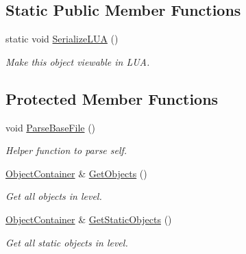 \subsection*{Static Public Member Functions}
\begin{DoxyCompactItemize}
\item 
static void \hyperlink{classLevel_ab98f9b8b299ed04baf8416a2c2664e66}{Serialize\+L\+UA} ()
\begin{DoxyCompactList}\small\item\em Make this object viewable in L\+UA. \end{DoxyCompactList}\end{DoxyCompactItemize}
\subsection*{Protected Member Functions}
\begin{DoxyCompactItemize}
\item 
void \hyperlink{classLevel_abd967e5cb5aaf80e35d3b5b2a1038468}{Parse\+Base\+File} ()
\begin{DoxyCompactList}\small\item\em Helper function to parse self. \end{DoxyCompactList}\item 
\hyperlink{classLevel_afd39ad8a5d9272ab8e14853e0fb18a48}{Object\+Container} \& \hyperlink{classLevel_afffae2c1f9f3cf545ec226f5d012910e}{Get\+Objects} ()
\begin{DoxyCompactList}\small\item\em Get all objects in level. \end{DoxyCompactList}\item 
\hyperlink{classLevel_afd39ad8a5d9272ab8e14853e0fb18a48}{Object\+Container} \& \hyperlink{classLevel_a7e34c8805f1c019216fe8810a0811652}{Get\+Static\+Objects} ()
\begin{DoxyCompactList}\small\item\em Get all static objects in level. \end{DoxyCompactList}\end{DoxyCompactItemize}
